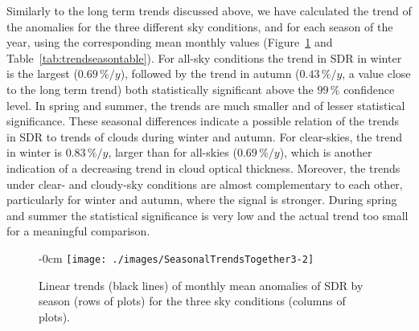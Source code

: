 \documentclass[applsci,article,submit,moreauthors,pdftex]{Definitions/mdpi}
\providecommand{\DIFadd}[1]{{\protect\color{blue}\uwave{#1}}} %
\providecommand{\DIFdel}[1]{{\protect\color{red}\sout{#1}}}                      %
\providecommand{\DIFaddbegin}{} %
\providecommand{\DIFaddend}{} %
\providecommand{\DIFdelbegin}{} %
\providecommand{\DIFdelend}{} %
\begin{document}
Similarly to the long term trends discussed above, we have calculated
the trend of the anomalies for the three different sky conditions, and
for each season of the year, using the corresponding mean monthly values
(Figure~\ref{fig:seasonalALL} and Table~\ref{tab:trendseasontable}). For
all-sky conditions the trend in SDR in winter is the largest
(\(0.69\,\%/y\)), followed by the trend in autumn (\(0.43\,\%/y\), a
value close to the long term trend) both statistically significant above
the \(99\,\%\) confidence level. In spring and summer, the trends are
much smaller and of lesser statistical significance. These seasonal
differences indicate a possible relation of the trends in SDR to trends
of clouds during winter and autumn. For clear-skies, the trend in winter
is \DIFdelbegin \DIFdel{\(0.83\,\%/y\)}\DIFdelend \DIFaddbegin \DIFadd{\(0.36\,\%/y\)}\DIFaddend , larger than for all-skies (\(0.69\,\%/y\)), which is
another indication of a decreasing trend in cloud optical thickness.
Moreover, the trends under clear- and cloudy-sky conditions are almost
complementary to each other, particularly for winter and autumn, where
the signal is stronger. During spring and summer the statistical
significance is very low and the actual trend too small for a meaningful
comparison.

\begin{figure}[h!]
    \begin{adjustwidth}{-\extralength}{0cm}
        {\centering 
            \texttt{[image: ./images/SeasonalTrendsTogether3-2]} 
        }
        \caption{Linear trends (black lines) of monthly mean anomalies of SDR by season (rows of plots) for the three sky conditions (columns of plots).}\label{fig:seasonalALL}
    \end{adjustwidth}
\end{figure}
\end{document}

